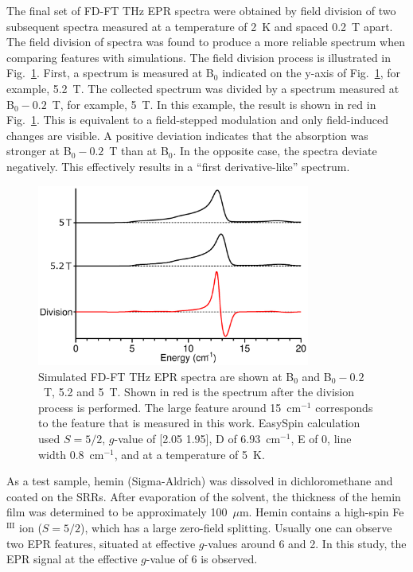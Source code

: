 The final set of FD-FT THz EPR spectra were obtained by field division of two subsequent spectra measured at a temperature of 2~K and spaced 0.2~T apart. The field division of spectra was found to produce a more reliable spectrum when comparing features with simulations. \cite{Schnegg09,Nehrkorn13,NEHRKORN201710} The field division process is illustrated in Fig.~\ref{ch4-fig:FDS}. First, a spectrum is measured at B$_0$ indicated on the y-axis of Fig.~\ref{ch4-fig:FDS}, for example, 5.2~T. The collected spectrum was divided by a spectrum measured at B$_0 - 0.2$~T, for example, 5~T. In this example, the result is shown in red in Fig.~\ref{ch4-fig:FDS}. This is equivalent to a field-stepped modulation and only field-induced changes are visible. A positive deviation indicates that the absorption was stronger at B$_0 - 0.2$~T than at B$_0$. In the opposite case, the spectra deviate negatively. This effectively results in a ``first derivative-like'' spectrum.

\begin{figure}[htp]
\centering
  \includegraphics[width=0.8\textwidth]{Kapitel/Ch4-Images/Ch4-ExperimentExplain.eps}
  \caption[FD-FT THz EPR field division of spectra]{Simulated FD-FT THz EPR spectra are shown at B$_0$ and B$_0 - 0.2$~T, 5.2 and 5~T. Shown in red is the spectrum after the division process is performed. The large feature around 15~cm$^{-1}$ corresponds to the feature that is measured in this work. EasySpin calculation used $S=5/2$, $g$-value of [2.05 1.95], D of 6.93~cm$^{-1}$, E of 0, line width 0.8~cm$^{-1}$, and at a temperature of 5~K.}
  \label{ch4-fig:FDS}
\end{figure}

As a test sample, hemin (Sigma-Aldrich) was dissolved in dichloromethane and coated on the SRRs. After evaporation of the solvent, the thickness of the hemin film was determined to be approximately 100~$\mu$m. Hemin contains a high-spin Fe$^\text{III}$ ion ($S = 5/2$), which has a large zero-field splitting. \cite{Nehrkorn15,Johnson66,Marathe73,Lang66} Usually one can observe two EPR features, situated at effective $g$-values around 6 and 2. \cite{Pilbrow90} In this study, the EPR signal at the effective $g$-value of 6 is observed. 


